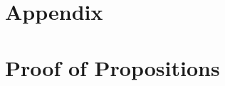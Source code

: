 
\section*{Appendix}

\section{Proof of Propositions}\label{sec:appendix}

\restateUntil*
            

